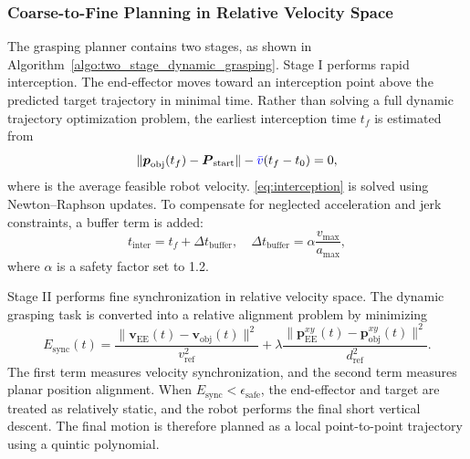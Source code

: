 \subsubsection{Coarse-to-Fine Planning in Relative Velocity Space}
The grasping planner contains two stages, as shown in Algorithm~\ref{algo:two_stage_dynamic_grasping}.  Stage I performs rapid interception. The end-effector moves toward an interception point above the predicted target trajectory in minimal time.  Rather than solving a full dynamic trajectory optimization problem, the earliest interception time $t_f$ is estimated from
\begin{equation}
\|\boldsymbol{p}_{\text{obj}}(t_f)-\boldsymbol{P}_{\text{start}}\|-{\color{blue}\bar v}(t_f-t_0)=0,
\label{eq:interception}
\end{equation}
where  is the average feasible robot velocity. \eqref{eq:interception} is solved using Newton--Raphson updates. To compensate for neglected acceleration and jerk constraints, a buffer term is added:
\begin{equation}
t_{\text{inter}}=t_f+\Delta t_{\text{buffer}},\quad
\Delta t_{\text{buffer}}=\alpha\frac{v_{\text{max}}}{a_{\text{max}}}, \label{equ:estimate}
\end{equation}
where $\alpha$ is a safety factor set to 1.2. 

Stage II performs fine synchronization in relative velocity space. The dynamic grasping task is converted into a relative alignment problem by minimizing
\begin{equation}
E_{\text{sync}}(t)=\frac{\|\boldsymbol{v}_{\text{EE}}(t)-\boldsymbol{v}_{\text{obj}}(t)\|^2}{v_{\text{ref}}^{2}}+
\lambda\frac{\|\boldsymbol{p}_{\text{EE}}^{xy}(t)-\boldsymbol{p}_{\text{obj}}^{xy}(t)\|^2}{d_{\text{ref}}^{2}}.
\label{eq:sync}
\end{equation}
 The first term measures velocity synchronization, and the second term measures planar position alignment. When $E_{\text{sync}}<\epsilon_{\text{safe}}$, the end-effector and target are treated as relatively static, and the robot performs the final short vertical descent.   The final motion is therefore planned as a local point-to-point trajectory using a quintic polynomial.

